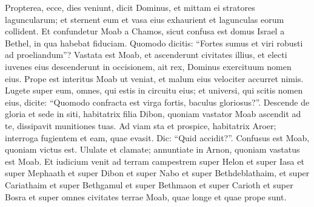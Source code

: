 \begin{biblechapter}
\begin{biblechapter}
\begin{biblechapter}
\begin{biblechapter}
\begin{biblechapter}
\begin{biblechapter}
\begin{biblechapter}
\begin{biblechapter}
\begin{biblechapter}
\begin{biblechapter}
\begin{biblechapter}
\begin{biblechapter}
\begin{biblechapter}
\begin{biblechapter}
\begin{biblechapter}
\begin{biblechapter}
\begin{biblechapter}
\begin{biblechapter}
\begin{biblechapter}
\begin{biblechapter}
\begin{biblechapter}
\begin{biblechapter}
\begin{biblechapter}
\begin{biblechapter}
\begin{biblechapter}
\begin{biblechapter}
\begin{biblechapter}
\begin{biblechapter}
\begin{biblechapter}
\begin{biblechapter}
\begin{biblechapter}
\begin{biblechapter}
\begin{biblechapter}
\begin{biblechapter}
\begin{biblechapter}
\begin{biblechapter}
\begin{biblechapter}
\begin{biblechapter}
\begin{biblechapter}
\begin{biblechapter}
\begin{biblechapter}
\begin{biblechapter}
\begin{biblechapter}
\begin{biblechapter}
\begin{biblechapter}
\begin{biblechapter}
\begin{biblechapter}
\begin{biblechapter}
 \verse Propterea, ecce, dies veniunt,
 dicit Dominus,
 et mittam ei stratores laguncularum;
 et sternent eum
 et vasa eius exhaurient
 et lagunculas eorum collident.
 \verse Et confundetur Moab a Chamos, sicut confusa est domus Israel a Bethel, in qua habebat fiduciam.
 \verse Quomodo dicitis: “Fortes sumus
 et viri robusti ad proeliandum”?
 \verse Vastata est Moab,
 et ascenderunt civitates illius,
 et electi iuvenes eius descenderunt in occisionem,
 ait rex, Dominus exercituum nomen eius.
 \verse Prope est interitus Moab ut veniat,
 et malum eius velociter accurret nimis.
 \verse Lugete super eum,
 omnes, qui estis in circuitu eius;
 et universi, qui scitis nomen eius,
 dicite: “Quomodo confracta est virga fortis,
 baculus gloriosus?”.
 \verse Descende de gloria et sede in siti,
 habitatrix filia Dibon,
 quoniam vastator Moab ascendit ad te,
 dissipavit munitiones tuas.
 \verse Ad viam sta et prospice,
 habitatrix Aroer;
 interroga fugientem
 et eam, quae evasit.
 Dic: “Quid accidit?”.
 \verse Confusus est Moab, quoniam victus est.
 Ululate et clamate;
 annuntiate in Arnon,
 quoniam vastatus est Moab.
 \verse Et iudicium venit ad terram campestrem super Helon et super Iasa et super Mephaath 
\verse et super Dibon et super Nabo et super Bethdeblathaim, 
\verse et super Cariathaim et super Bethgamul et super Bethmaon 
\verse et super Carioth et super Bosra et super omnes civitates terrae Moab, quae longe et quae prope sunt.

\end{biblechapter}
\end{biblechapter}
\end{biblechapter}
\end{biblechapter}
\end{biblechapter}
\end{biblechapter}
\end{biblechapter}
\end{biblechapter}
\end{biblechapter}
\end{biblechapter}
\end{biblechapter}
\end{biblechapter}
\end{biblechapter}
\end{biblechapter}
\end{biblechapter}
\end{biblechapter}
\end{biblechapter}
\end{biblechapter}
\end{biblechapter}
\end{biblechapter}
\end{biblechapter}
\end{biblechapter}
\end{biblechapter}
\end{biblechapter}
\end{biblechapter}
\end{biblechapter}
\end{biblechapter}
\end{biblechapter}
\end{biblechapter}
\end{biblechapter}
\end{biblechapter}
\end{biblechapter}
\end{biblechapter}
\end{biblechapter}
\end{biblechapter}
\end{biblechapter}
\end{biblechapter}
\end{biblechapter}
\end{biblechapter}
\end{biblechapter}
\end{biblechapter}
\end{biblechapter}
\end{biblechapter}
\end{biblechapter}
\end{biblechapter}
\end{biblechapter}
\end{biblechapter}
\end{biblechapter}
